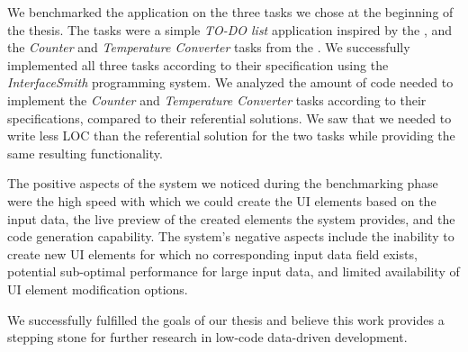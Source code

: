 We benchmarked the application on the three tasks we chose at the beginning of the thesis.
The tasks were a simple \emph{TO-DO list} application inspired by the \citet{TodoMVC}, and the \emph{Counter} and \emph{Temperature Converter} tasks from the \citet{7GUIs-web}.
We successfully implemented all three tasks according to their specification using the \emph{InterfaceSmith} programming system.
We analyzed the amount of code needed to implement the \emph{Counter} and \emph{Temperature Converter} tasks according to their specifications, compared to their referential solutions.
We saw that we needed to write less LOC than the referential solution for the two tasks while providing the same resulting functionality.


The positive aspects of the system we noticed during the benchmarking phase were the high speed with which we could create the UI elements based on the input data, the live preview of the created elements the system provides, and the code generation capability.
The system's negative aspects include the inability to create new UI elements for which no corresponding input data field exists, potential sub-optimal performance for large input data, and limited availability of UI element modification options.

We successfully fulfilled the goals of our thesis and believe this work provides a stepping stone for further research in low-code data-driven development.




